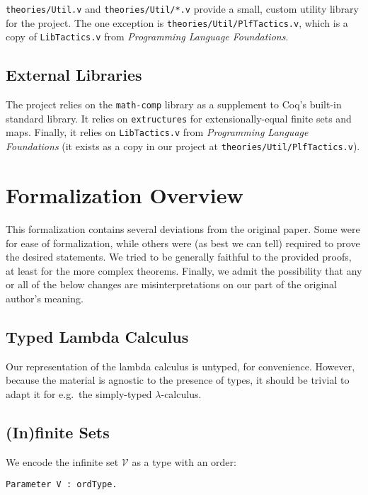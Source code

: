 \documentclass{article}
\begin{document}
\verb|theories/Util.v| and \verb|theories/Util/*.v| provide a small, custom utility library for the
project. The one exception is \verb|theories/Util/PlfTactics.v|, which is a copy of
\verb|LibTactics.v| from \emph{Programming Language Foundations}.

\subsection{External Libraries}

The project relies on the \verb|math-comp| library as a supplement to Coq's built-in standard
library. It relies on \verb|extructures| for extensionally-equal finite sets and maps. Finally, it
relies on \verb|LibTactics.v| from \emph{Programming Language Foundations} (it exists as a copy in our
project at \verb|theories/Util/PlfTactics.v|).

\section{Formalization Overview}

This formalization contains several deviations from the original paper. Some were for ease of
formalization, while others were (as best we can tell) required to prove the desired statements.
We tried to be generally faithful to the provided proofs, at least for the more complex theorems.
Finally, we admit the possibility that any or all of the below changes are
misinterpretations on our part of the original author's meaning.

\subsection{Typed Lambda Calculus}

Our representation of the lambda calculus is untyped, for convenience. However, because the material
is agnostic to the presence of types, it should be trivial to adapt it for e.g.\ the simply-typed
$\lambda$-calculus.

\subsection{(In)finite Sets}

We encode the infinite set $\mathcal{V}$ as a type with an order:

\begin{verbatim}
Parameter V : ordType.
\end{verbatim}
\end{document}
